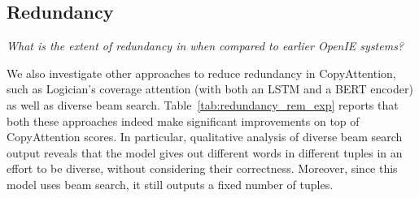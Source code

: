         \vspace{0.5ex}
    \subsection{Redundancy}
        \emph{What is the extent of redundancy in \shortname{} when compared to earlier OpenIE systems?}

        \begin{table}[h]
            \caption{Models to solve the redundancy issue prevalent in Generative Neural OpenIE systems. All systems are bootstrapped on OpenIE-4.}
            \label{tab:redundancy_rem_exp}
        \end{table}

        We also investigate other approaches to reduce redundancy in CopyAttention, such as Logician's coverage attention (with both an LSTM and a BERT encoder) as well as diverse beam search. 
        Table~\ref{tab:redundancy_rem_exp} reports that both these approaches indeed make significant improvements on top of CopyAttention scores. 
        In particular, qualitative analysis of diverse beam search output reveals that the model gives out different words in different tuples in an effort to be diverse, without considering their correctness. 
        Moreover, since this model uses beam search, it still outputs a fixed number of tuples.

